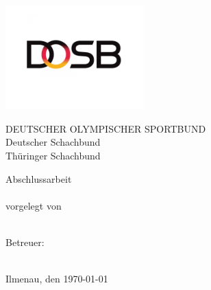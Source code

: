 \begin{titlepage}

\begin{center}
\includegraphics[height=4cm]{pics/DOSB.png}
\vspace{1cm}

DEUTSCHER OLYMPISCHER SPORTBUND\\
Deutscher Schachbund\\
Thüringer Schachbund

\vspace{4cm}

{\large Abschlussarbeit} \\ 
\vspace{1cm}
{\LARGE \normalfont \bfseries \sathema} \\
\vspace{1cm}
{vorgelegt von} \\
\vspace{0.5cm}
{\large \saauthor}\\
\vspace{2cm}

Betreuer: \\
\vspace{0.5cm}
\saprof \\

\vspace{1cm}

Ilmenau, den \today
\end{center}

\end{titlepage}
